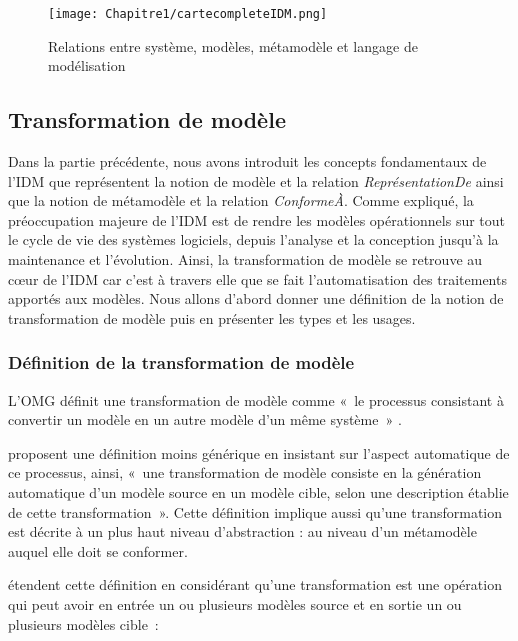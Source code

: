 \begin{figure}[!htbp]
 \begin{center}
  \texttt{[image: Chapitre1/cartecompleteIDM.png]}
 \end{center}
 \caption{Relations entre système, modèles, métamodèle et langage de 
modélisation \protect\cite{favre2006ingenierie}}
 \label{fig:carteFavre}
\end{figure}

\subsection{Transformation de modèle}
Dans la partie précédente, nous avons introduit les concepts fondamentaux de 
l'IDM que représentent la notion de modèle et la relation 
\textit{ReprésentationDe} ainsi que la notion de métamodèle et la relation 
\textit{ConformeÀ}. Comme expliqué, la préoccupation majeure de l'IDM est de 
rendre les modèles opérationnels sur tout le cycle de vie des systèmes 
logiciels, depuis l'analyse et la conception jusqu'à la maintenance et 
l'évolution. Ainsi, la transformation de modèle se retrouve au cœur de l'IDM car 
c'est à travers elle que se fait l'automatisation des traitements apportés aux 
modèles. Nous allons d'abord donner une définition de la notion de 
transformation de modèle puis en présenter les types et les usages.

\subsubsection{Définition de la transformation de modèle}
L'OMG définit une transformation de modèle comme «~le processus consistant à 
convertir un modèle en un autre modèle d'un même système~» \cite{omg2011meta}. 

\cite{kleppe2003mda} proposent une définition moins générique en insistant sur 
l'aspect automatique de ce processus, ainsi, «~une transformation de modèle 
consiste en la génération automatique d'un modèle source en un modèle cible, 
selon une description établie de cette transformation~». Cette définition 
implique aussi qu'une transformation est décrite à un plus haut niveau 
d'abstraction : au niveau d'un métamodèle auquel elle doit se conformer. 

\cite{mens2006taxonomy} étendent cette définition en considérant qu'une 
transformation est une opération qui peut avoir en entrée un ou plusieurs 
modèles source et en sortie un ou plusieurs modèles cible~: 

